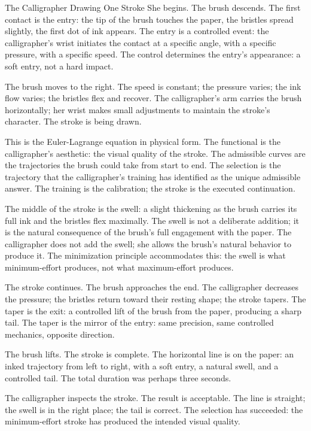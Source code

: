 \begin{coda}{The Calligrapher Drawing One Stroke}
She begins. The brush descends. The first contact is the entry:
the tip of the brush touches the paper, the bristles spread
slightly, the first dot of ink appears. The entry is a controlled
event: the calligrapher's wrist initiates the contact at a
specific angle, with a specific pressure, with a specific speed.
The control determines the entry's appearance: a soft entry, not
a hard impact.

The brush moves to the right. The speed is constant; the
pressure varies; the ink flow varies; the bristles flex and
recover. The calligrapher's arm carries the brush horizontally;
her wrist makes small adjustments to maintain the stroke's
character. The stroke is being drawn.

This is the Euler-Lagrange equation in physical form. The
functional is the calligrapher's aesthetic: the visual quality of
the stroke. The admissible curves are the trajectories the brush
could take from start to end. The selection is the trajectory
that the calligrapher's training has identified as the unique
admissible answer. The training is the calibration; the stroke
is the executed continuation.

The middle of the stroke is the swell: a slight thickening as the
brush carries its full ink and the bristles flex maximally. The
swell is not a deliberate addition; it is the natural consequence
of the brush's full engagement with the paper. The calligrapher
does not add the swell; she allows the brush's natural behavior
to produce it. The minimization principle accommodates this:
the swell is what minimum-effort produces, not what
maximum-effort produces.

The stroke continues. The brush approaches the end. The
calligrapher decreases the pressure; the bristles return toward
their resting shape; the stroke tapers. The taper is the exit:
a controlled lift of the brush from the paper, producing a
sharp tail. The taper is the mirror of the entry: same precision,
same controlled mechanics, opposite direction.

The brush lifts. The stroke is complete. The horizontal line is
on the paper: an inked trajectory from left to right, with a
soft entry, a natural swell, and a controlled tail. The total
duration was perhaps three seconds.

The calligrapher inspects the stroke. The result is acceptable.
The line is straight; the swell is in the right place; the
tail is correct. The selection has succeeded: the minimum-effort
stroke has produced the intended visual quality.


\end{coda}
